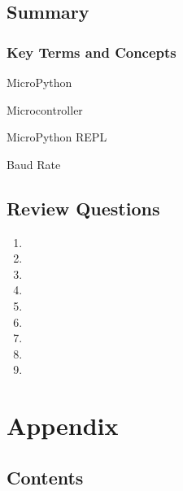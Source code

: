 \documentclass{book}
\begin{document}
    
        \section{Summary}\label{summary}
    




    
        \subsection{Key Terms and Concepts}\label{key-terms-and-concepts}
    




    
        MicroPython

Microcontroller

MicroPython REPL

Baud Rate
    




    
        \section{Review Questions}\label{review-questions}
    




    
        \begin{enumerate}
\def\labelenumi{\arabic{enumi}.}
\item
\item
\item
\item
\item
\item
\item
\item
\item
\end{enumerate}
    




    
        \chapter{Appendix}\label{appendix}
    




    
        \section{Contents}\label{contents}
    
\end{document}
